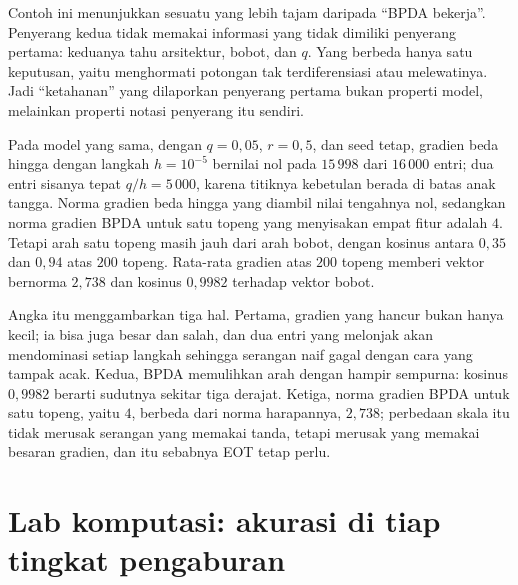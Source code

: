Contoh ini menunjukkan sesuatu yang lebih tajam daripada ``BPDA bekerja''. Penyerang
kedua tidak memakai informasi yang tidak dimiliki penyerang pertama: keduanya tahu
arsitektur, bobot, dan $q$. Yang berbeda hanya satu keputusan, yaitu menghormati potongan
tak terdiferensiasi atau melewatinya. Jadi ``ketahanan'' yang dilaporkan penyerang pertama
bukan properti model, melainkan properti notasi penyerang itu sendiri.

\begin{contoh}
Pada model yang sama, dengan $q=0{,}05$, $r=0{,}5$, dan seed tetap, gradien beda
hingga dengan langkah $h=10^{-5}$ bernilai nol pada $15\,998$ dari $16\,000$ entri;
dua entri sisanya tepat $q/h=5\,000$, karena titiknya kebetulan berada di batas anak
tangga. Norma gradien beda hingga yang diambil nilai tengahnya nol, sedangkan norma
gradien BPDA untuk satu topeng yang menyisakan empat fitur adalah $4$. Tetapi arah satu
topeng masih jauh dari arah bobot, dengan kosinus antara $0{,}35$ dan $0{,}94$ atas
$200$ topeng. Rata-rata gradien atas $200$ topeng memberi vektor bernorma $2{,}738$ dan
kosinus $0{,}9982$ terhadap vektor bobot.
\end{contoh}

Angka itu menggambarkan tiga hal. Pertama, gradien yang hancur bukan hanya kecil; ia bisa
juga besar dan salah, dan dua entri yang melonjak akan mendominasi setiap langkah
sehingga serangan naif gagal dengan cara yang tampak acak. Kedua, BPDA memulihkan arah
dengan hampir sempurna: kosinus $0{,}9982$ berarti sudutnya sekitar tiga derajat. Ketiga,
norma gradien BPDA untuk satu topeng, yaitu $4$, berbeda dari norma harapannya, $2{,}738$;
perbedaan skala itu tidak merusak serangan yang memakai tanda, tetapi merusak yang memakai
besaran gradien, dan itu sebabnya EOT tetap perlu.


\section{Lab komputasi: akurasi di tiap tingkat pengaburan}


